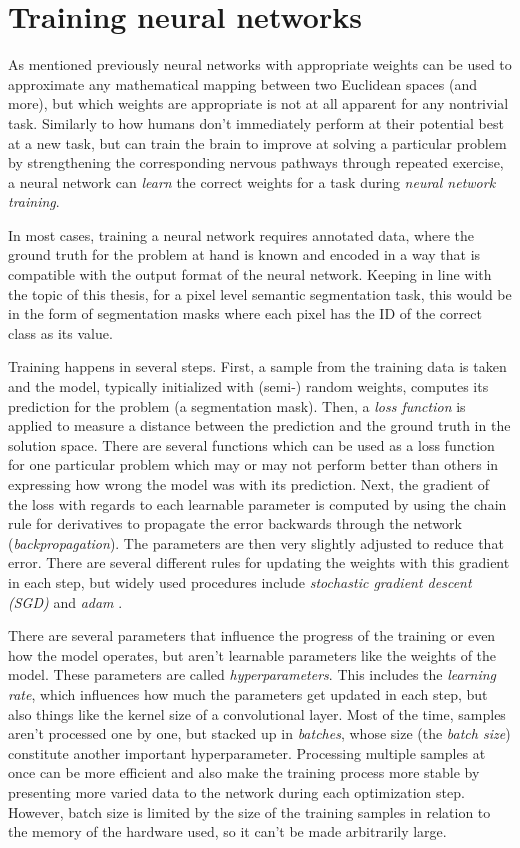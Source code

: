 \section{Training neural networks}
\label{sec:training}

As mentioned previously neural networks with appropriate weights can be used to approximate any mathematical mapping between two Euclidean spaces (and more), but which weights are appropriate is not at all apparent for any nontrivial task. 
Similarly to how humans don't immediately perform at their potential best at a new task, but can train the brain to improve at solving a particular problem by strengthening the corresponding nervous pathways through repeated exercise, a neural network can \emph{learn} the correct weights for a task during \emph{neural network training}.

In most cases, training a neural network requires annotated data, where the ground truth for the problem at hand is known and encoded in a way that is compatible with the output format of the neural network. 
Keeping in line with the topic of this thesis, for a pixel level semantic segmentation task, this would be in the form of segmentation masks where each pixel has the ID of the correct class as its value. 

Training happens in several steps. First, a sample from the training data is taken and the model, typically initialized with (semi-) random weights, computes its prediction for the problem (a segmentation mask). Then, a \emph{loss function} is applied to measure a distance between the prediction and the ground truth in the solution space. 
There are several functions which can be used as a loss function for one particular problem which may or may not perform better than others in expressing how wrong the model was with its prediction. 
Next, the gradient of the loss with regards to each learnable parameter is computed by using the chain rule for derivatives to propagate the error backwards through the network (\emph{backpropagation}). 
The parameters are then very slightly adjusted to reduce that error. 
There are several different rules for updating the weights with this gradient in each step, but widely used procedures include \emph{stochastic gradient descent (SGD)} and \emph{adam} \cite{kingmaAdamMethodStochastic2017}. 

There are several parameters that influence the progress of the training or even how the model operates, but aren't learnable parameters like the weights of the model. 
These parameters are called \emph{hyperparameters}. This includes the \emph{learning rate}, which influences how much the parameters get updated in each step, but also things like the kernel size of a convolutional layer. 
Most of the time, samples aren't processed one by one, but stacked up in \emph{batches}, whose size (the \emph{batch size}) constitute another important hyperparameter. 
Processing multiple samples at once can be more efficient and also make the training process more stable by presenting more varied data to the network during each optimization step. However, batch size is limited by the size of the training samples in relation to the memory of the hardware used, so it can't be made arbitrarily large. 

